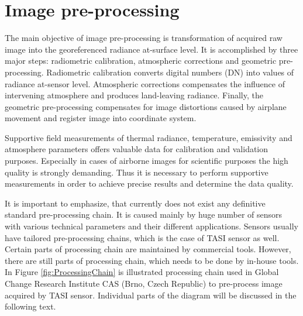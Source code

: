 \section{Image pre-processing}

The main objective of image pre-processing is transformation of acquired raw image into the georeferenced radiance at-surface level. It is accomplished by three major steps: radiometric calibration, atmospheric corrections and geometric pre-processing. Radiometric calibration converts digital numbers (DN) into values of radiance at-sensor level. Atmospheric corrections compensates the influence of intervening atmosphere and produces land-leaving radiance. Finally, the geometric pre-processing compensates for image distortions caused by airplane movement and register image into coordinate system.

Supportive field measurements of thermal radiance, temperature, emissivity and atmosphere parameters offers valuable data for calibration and validation purposes. Especially in cases of airborne images for scientific purposes the high quality is strongly demanding. Thus it is necessary to perform supportive measurements in order to achieve precise results and determine the data quality.

It is important to emphasize, that currently does not exist any definitive standard pre-processing chain. It is caused mainly by huge number of sensors with various technical parameters and their different applications. Sensors usually have tailored pre-processing chains, which is the case of TASI sensor as well. Certain parts of processing chain are maintained by commercial tools. However, there are still parts of processing chain, which needs to be done by in-house tools. In Figure \ref{fig:ProcessingChain} is illustrated processing chain used in Global Change Research Institute CAS (Brno, Czech Republic) to pre-process image acquired by TASI sensor. Individual parts of the diagram will be discussed in the following text.

